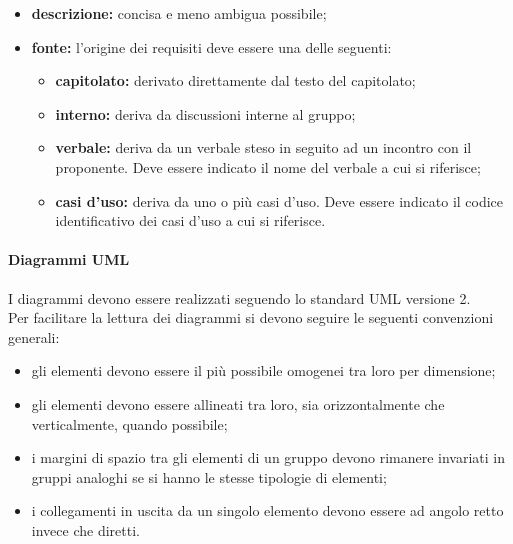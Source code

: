             \begin{itemize}
                \item \textbf{descrizione:} concisa e meno ambigua possibile;
                \item \textbf{fonte:} l'origine dei requisiti deve essere una delle seguenti:
                \begin{itemize}
                    \item \textbf{capitolato:} derivato direttamente dal testo del capitolato;
                    \item \textbf{interno:} deriva da discussioni interne al gruppo;
                    \item \textbf{verbale:} deriva da un verbale steso in seguito ad un incontro con il proponente. Deve essere indicato il nome del verbale a cui si riferisce;
                    \item \textbf{casi d'uso:} deriva da uno o più casi d'uso. Deve essere indicato il codice identificativo dei casi d'uso a cui si riferisce.
                \end{itemize}
            \end{itemize}
            \paragraph{Diagrammi UML} \label{sec:astahStyle}
                I diagrammi  devono essere realizzati seguendo lo standard UML versione 2. \\
                Per facilitare la lettura dei diagrammi si devono seguire le seguenti convenzioni generali:
                \begin{itemize}
                    \item gli elementi devono essere il più possibile omogenei tra loro per dimensione;
                    \item gli elementi devono essere allineati tra loro, sia orizzontalmente che verticalmente, quando possibile;
                    \item i margini di spazio tra gli elementi di un gruppo devono rimanere invariati in gruppi analoghi se si hanno le stesse tipologie di elementi;
                    \item i collegamenti in uscita da un singolo elemento devono essere ad angolo retto invece che diretti.
                \end{itemize}
